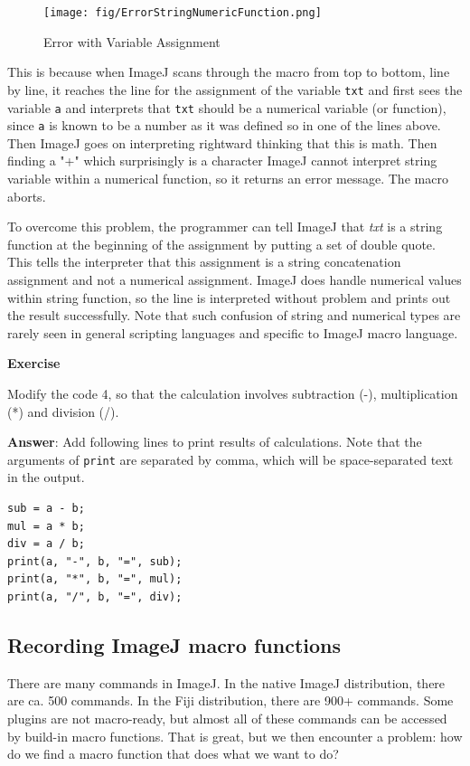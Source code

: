 \documentclass[11pt,a4paper,oneside]{report}
\newenvironment{indentexercise}[1]
{{\setlength{\leftmargin}{2em}}
\textbf{Exercise \thesubsection-#1}
\begin{list}{}
	\item
}
{\end{list}}
\newcommand{\ilcom}[1]{\texttt{\small#1}}
\begin{document}
\begin{figure}[htbp]
\begin{center}
\texttt{[image: fig/ErrorStringNumericFunction.png]}
\caption{Error with Variable Assignment} \label{fig_ErrorVariable}
\end{center}
\end{figure}

This is because when ImageJ scans through the macro from top to bottom, line by line, 
it reaches the line for the assignment of the variable \ilcom{txt} and first sees the variable \ilcom{a} and interprets that \ilcom{txt} should be a numerical variable 
(or function), since \ilcom{a} is known to be a number as it was defined so in one of the lines above. Then ImageJ goes on interpreting rightward thinking that this is math. Then finding a "+" which surprisingly is a character
ImageJ cannot interpret string variable within a numerical function, so it returns an error message. The macro aborts.  

To overcome this problem, the programmer can tell ImageJ that 
\textit{txt} is a string function at the beginning of the assignment 
by putting a set of double quote. This tells the interpreter that this assignment is a string concatenation assignment and not a numerical assignment. 
ImageJ does handle numerical values within string function, 
so the line is interpreted without problem and prints out the result successfully. Note that such confusion of string and numerical types are rarely seen in general scripting languages and specific to ImageJ macro language.

\begin{indentexercise}{2}

\item Modify the code 4, so that the calculation involves subtraction (-), multiplication (*) and division (/).

\item \textbf{Answer}: Add following lines to print results of calculations. Note that the arguments of \ilcom{print} are separated by comma, which will be space-separated text in the output.  
\begin{lstlisting}[numbers=none]
sub = a - b;
mul = a * b;
div = a / b;
print(a, "-", b, "=", sub);
print(a, "*", b, "=", mul);
print(a, "/", b, "=", div);
\end{lstlisting}

\end{indentexercise}
   \subsection{Recording ImageJ macro functions}
There are many commands in ImageJ. In the native ImageJ distribution, there are ca. 500 commands. In the Fiji distribution, there are 900+ commands. Some plugins are not macro-ready, but almost all of these commands can be accessed by build-in macro functions. That is great, but we then encounter a problem: how do we find a macro function that does what we want to do?
\end{document}
